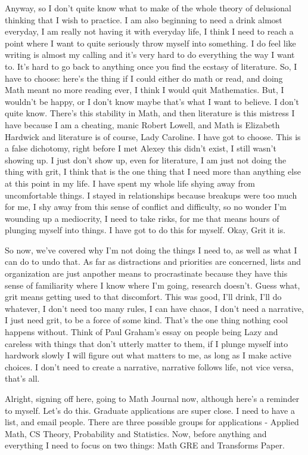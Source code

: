 Anyway, so I don't quite know what to make of the whole theory of delusional thinking that I wish to practice. I am also beginning to need a drink almost everyday, I am really not having it with everyday life, I think I need to reach a point where I want to quite seriously throw myself into something. I do feel like writing is almost my calling and it's very hard to do everything the way I want to. It's hard to go back to anything once you find the ecstasy of literature. So, I have to choose: here's the thing if I could either do math or read, and doing Math meant no more reading ever, I think I would quit Mathematics. But, I wouldn't be happy, or I don't know maybe that's what I want to believe. I don't quite know. There's this stability in Math, and then literature is this mistress I have because I am a cheating, manic Robert Lowell, and Math is Elizabeth Hardwick and literature is of course, Lady Caroline. I have got to choose. This is a false dichotomy, right before I met Alexey this didn't exist, I still wasn't showing up. I just don't show up, even for literature, I am just not doing the thing with grit, I think that is the one thing that I need more than anything else at this point in my life. I have spent my whole life shying away from uncomfortable things. I stayed in relationships because breakups were too much for me, I shy away from this sense of conflict and difficulty, so no wonder I'm wounding up a mediocrity, I need to take risks, for me that means hours of plunging myself into things. I have got to do this for myself. Okay, Grit it is.

So now, we've covered why I'm not doing the things I need to, as well as what I can do to undo that. As far as distractions and priorities are concerned, lists and organization are just anpother means to procrastinate because they have this sense of familiarity where I know where I'm going, research doesn't. Guess what, grit means getting used to that discomfort. This was good, I'll drink, I'll do whatever, I don't need too many rules, I can have chaos, I don't need a narrative, I just need grit, to be a force of some kind. That's the one thing nothing cool happens without. Think of Paul Graham's essay on people being Lazy and careless with things that don't utterly matter to them, if I plunge myself into hardwork slowly I will figure out what matters to me, as long as I make active choices. I don't need to create a narrative, narrative follows life, not vice versa, that's all.

Alright, signing off here, going to Math Journal now, although here's a reminder to myself. Let's do this. Graduate applications are super close. I need to have a list, and email people. There are three possible groups for applications - Applied Math, CS Theory, Probability and Statistics.  Now, before anything and everything I need to focus on two things: Math GRE and Transforms Paper.